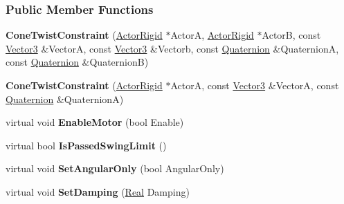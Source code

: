 \subsubsection*{Public Member Functions}
\begin{DoxyCompactItemize}
\item 
\hypertarget{classphys_1_1ConeTwistConstraint_af37bd328d20c466f3e004f2fd94d2f29}{
{\bfseries ConeTwistConstraint} (\hyperlink{classphys_1_1ActorRigid}{ActorRigid} $\ast$ActorA, \hyperlink{classphys_1_1ActorRigid}{ActorRigid} $\ast$ActorB, const \hyperlink{classphys_1_1Vector3}{Vector3} \&VectorA, const \hyperlink{classphys_1_1Vector3}{Vector3} \&Vectorb, const \hyperlink{classphys_1_1Quaternion}{Quaternion} \&QuaternionA, const \hyperlink{classphys_1_1Quaternion}{Quaternion} \&QuaternionB)}
\label{classphys_1_1ConeTwistConstraint_af37bd328d20c466f3e004f2fd94d2f29}

\item 
\hypertarget{classphys_1_1ConeTwistConstraint_ae50c1b840288356b0a1282d4de13d9ef}{
{\bfseries ConeTwistConstraint} (\hyperlink{classphys_1_1ActorRigid}{ActorRigid} $\ast$ActorA, const \hyperlink{classphys_1_1Vector3}{Vector3} \&VectorA, const \hyperlink{classphys_1_1Quaternion}{Quaternion} \&QuaternionA)}
\label{classphys_1_1ConeTwistConstraint_ae50c1b840288356b0a1282d4de13d9ef}

\item 
\hypertarget{classphys_1_1ConeTwistConstraint_a892dfbedb388b833cc351e613ee0c3bb}{
virtual void {\bfseries EnableMotor} (bool Enable)}
\label{classphys_1_1ConeTwistConstraint_a892dfbedb388b833cc351e613ee0c3bb}

\item 
\hypertarget{classphys_1_1ConeTwistConstraint_af203041cf8e52374987b2e775bd1b4de}{
virtual bool {\bfseries IsPassedSwingLimit} ()}
\label{classphys_1_1ConeTwistConstraint_af203041cf8e52374987b2e775bd1b4de}

\item 
\hypertarget{classphys_1_1ConeTwistConstraint_a44d9404a7a373da7015cbf2dc1084791}{
virtual void {\bfseries SetAngularOnly} (bool AngularOnly)}
\label{classphys_1_1ConeTwistConstraint_a44d9404a7a373da7015cbf2dc1084791}

\item 
\hypertarget{classphys_1_1ConeTwistConstraint_a6cfac8d25468b5349be54982290f49a2}{
virtual void {\bfseries SetDamping} (\hyperlink{namespacephys_af7eb897198d265b8e868f45240230d5f}{Real} Damping)}
\label{classphys_1_1ConeTwistConstraint_a6cfac8d25468b5349be54982290f49a2}


\end{DoxyCompactItemize}
